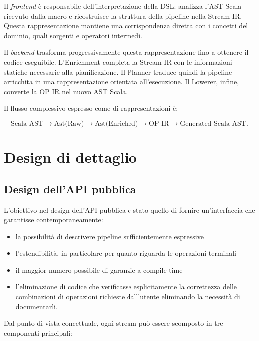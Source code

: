 \documentclass[a4paper,11pt]{report}
\theoremstyle{definition}
\begin{document}
Il \emph{frontend} è responsabile dell'interpretazione della DSL: analizza l'AST Scala ricevuto dalla macro e ricostruisce la struttura della pipeline nella Stream IR. Questa rappresentazione mantiene una corrispondenza diretta con i concetti del dominio, quali sorgenti e operatori intermedi.

Il \emph{backend} trasforma progressivamente questa rappresentazione fino a ottenere il codice eseguibile. L'Enrichment completa la Stream IR con le informazioni statiche necessarie alla pianificazione. Il Planner traduce quindi la pipeline arricchita in una rappresentazione orientata all'esecuzione. Il Lowerer, infine, converte la OP IR nel nuovo AST Scala.

Il flusso complessivo espresso come di rappresentazioni è:

\begin{equation*}
  \text{Scala AST}
  \longrightarrow
  \text{Ast(Raw)}
  \longrightarrow
  \text{Ast(Enriched)}
  \longrightarrow
  \text{OP IR}
  \longrightarrow
  \text{Generated Scala AST}.
\end{equation*}

\chapter{Design di dettaglio}
\label{chap:design}

\section{Design dell'API pubblica}
\label{sec:api}

L'obiettivo nel design dell'API pubblica è stato quello di fornire un'interfaccia che garantisse contemporaneamente:

\begin{itemize}
  \item la possibilità di descrivere pipeline sufficientemente espressive
  \item l'estendibilità, in particolare per quanto riguarda le operazioni terminali
  \item il maggior numero possibile di garanzie a compile time
  \item l'eliminazione di codice che verificasse esplicitamente la correttezza
    delle combinazioni di operazioni richieste dall'utente eliminando la necessità di documentarli.
\end{itemize}

Dal punto di vista concettuale, ogni stream può essere scomposto in tre componenti principali:
\end{document}
